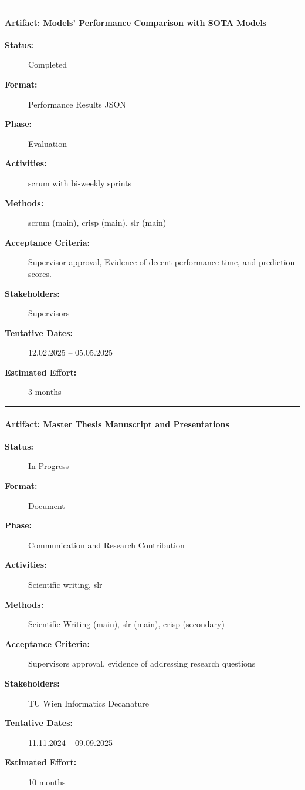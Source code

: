 \noindent\rule{13cm}{0.3pt}


\paragraph{Artifact: Models' Performance Comparison with SOTA Models}
\begin{description}
  \item[\textbf{Status:}] Completed
  \item[\textbf{Format:}] Performance Results JSON
  \item[\textbf{Phase:}] Evaluation
  \item[\textbf{Activities:}] \acrshort{scrum} with bi-weekly sprints
  \item[\textbf{Methods:}] \acrshort{scrum} (main), \acrshort{crisp} (main), \acrshort{slr} (main)
  \item[\textbf{Acceptance Criteria:}] Supervisor approval, Evidence of decent performance time, and prediction scores.
  \item[\textbf{Stakeholders:}] Supervisors
  \item[\textbf{Tentative Dates:}] 12.02.2025 – 05.05.2025
  \item[\textbf{Estimated Effort:}] 3 months
\end{description}

\noindent\rule{13cm}{0.3pt}


\paragraph{Artifact: Master Thesis Manuscript and Presentations}
\begin{description}
  \item[\textbf{Status:}] In-Progress
  \item[\textbf{Format:}] Document
  \item[\textbf{Phase:}] Communication and Research Contribution
  \item[\textbf{Activities:}] Scientific writing, \acrshort{slr}
  \item[\textbf{Methods:}] Scientific Writing (main), \acrshort{slr} (main), \acrshort{crisp} (secondary)
  \item[\textbf{Acceptance Criteria:}] Supervisors approval, evidence of addressing research questions
  \item[\textbf{Stakeholders:}] TU Wien Informatics Decanature
  \item[\textbf{Tentative Dates:}] 11.11.2024 – 09.09.2025
  \item[\textbf{Estimated Effort:}] 10 months
\end{description}

